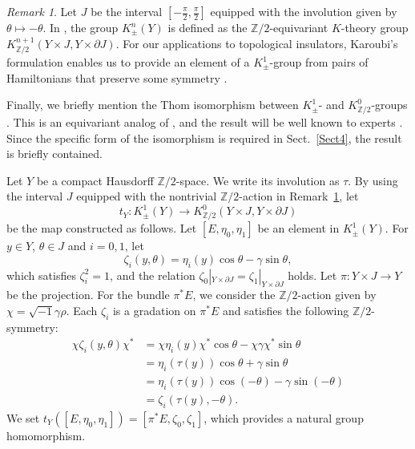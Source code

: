 \documentclass{amsart}
\theoremstyle{plain}
\theoremstyle{definition}
\theoremstyle{remark}
\newtheorem{remark}[theorem]{Remark}
\newcommand{\Z}{\mathbb{Z}}
\begin{document}
\begin{remark}
\label{interval}
Let $J$ be the interval $[-\frac{\pi}{2},\frac{\pi}{2}]$ equipped with the involution given by $\theta \mapsto -\theta$.
In \cite{AH04}, the group $K^n_{\pm}(Y)$ is defined as the $\Z/2$-equivariant $K$-theory group $K^{n+1}_{\Z/2}(Y \times J, Y \times \partial J)$.
For our applications to topological insulators, Karoubi's formulation enables us to provide an element of a $K^1_\pm$-group from pairs of Hamiltonians that preserve some symmetry \cite{Kit09, Thi16, Gomi23}.
\end{remark}

Finally, we briefly mention the Thom isomorphism between $K^1_{\pm}$- and $K^0_{\Z/2}$-groups \cite{AH04,Gomi15}.
This is an equivariant analog of \cite[Chapter~III, Theorem~5.10]{Karoubi78}, and the result will be well known to experts \cite{Karoubi68}.
Since the specific form of the isomorphism is required in Sect.~\ref{Sect4}, the result is briefly contained.

Let $Y$ be a compact Hausdorff $\Z/2$-space. We write its involution as $\tau$.
By using the interval $J$ equipped with the nontrivial $\Z/2$-action in Remark~\ref{interval}, let
\begin{equation}\label{t}
	t_Y \colon K^1_\pm(Y) \to K^0_{\Z/2}(Y \times J, Y \times \partial J)
\end{equation}
be the map constructed as follows.
Let $[E, \eta_0, \eta_1]$ be an element in $K^1_\pm(Y)$.
For $y \in Y$, $\theta \in J$ and $i=0,1$, let
\begin{equation*}
	\zeta_i(y,\theta) = \eta_i(y) \cos \theta - \gamma \sin \theta,
\end{equation*}
which satisfies $\zeta_i^2=1$, and the relation $\zeta_0|_{Y \times \partial J} = \zeta_1|_{Y \times \partial J}$ holds.
Let $\pi \colon Y \times J \to Y$ be the projection.
For the bundle $\pi^*E$, we consider the $\Z/2$-action given by $\chi = \sqrt{-1} \gamma \rho$.
Each $\zeta_i$ is a gradation on $\pi^*E$ and satisfies the following $\Z/2$-symmetry:
\begin{align*}
	\chi \zeta_i(y,\theta) \chi^* &= \chi \eta_i(y) \chi^* \cos \theta - \chi \gamma \chi^* \sin \theta\\
		&= \eta_i(\tau(y)) \cos \theta + \gamma \sin \theta \\
		&= \eta_i(\tau(y)) \cos (-\theta) - \gamma \sin (-\theta) \\
		&= \zeta_i(\tau(y), -\theta).
\end{align*}
We set $t_Y([E, \eta_0, \eta_1]) = [\pi^*E, \zeta_0, \zeta_1]$, which provides a natural group homomorphism.
\end{document}
